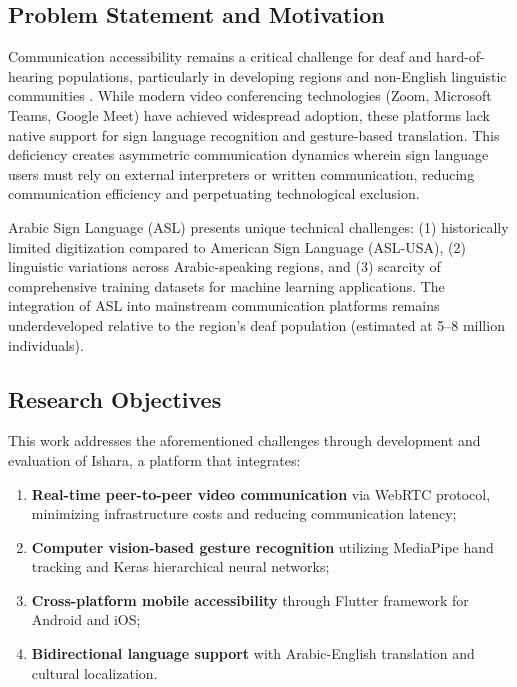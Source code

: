 \documentclass[11pt,a4paper,twoside]{report}
\begin{document}
\subsection{Problem Statement and Motivation}
\label{subsec:problem-statement}

Communication accessibility remains a critical challenge for deaf and hard-of-hearing populations, particularly in developing regions and non-English linguistic communities \cite{Mitchell2006, Kusters2015}. While modern video conferencing technologies (Zoom, Microsoft Teams, Google Meet) have achieved widespread adoption, these platforms lack native support for sign language recognition and gesture-based translation. This deficiency creates asymmetric communication dynamics wherein sign language users must rely on external interpreters or written communication, reducing communication efficiency and perpetuating technological exclusion.

Arabic Sign Language (ASL) presents unique technical challenges: (1) historically limited digitization compared to American Sign Language (ASL-USA), (2) linguistic variations across Arabic-speaking regions, and (3) scarcity of comprehensive training datasets for machine learning applications. The integration of ASL into mainstream communication platforms remains underdeveloped relative to the region's deaf population (estimated at 5--8 million individuals).

\subsection{Research Objectives}
\label{subsec:research-objectives}

This work addresses the aforementioned challenges through development and evaluation of Ishara, a platform that integrates:

\begin{enumerate}
    \item \textbf{Real-time peer-to-peer video communication} via WebRTC protocol, minimizing infrastructure costs and reducing communication latency;
    \item \textbf{Computer vision-based gesture recognition} utilizing MediaPipe hand tracking and Keras hierarchical neural networks;
    \item \textbf{Cross-platform mobile accessibility} through Flutter framework for Android and iOS;
    \item \textbf{Bidirectional language support} with Arabic-English translation and cultural localization.
\end{enumerate}
\end{document}

